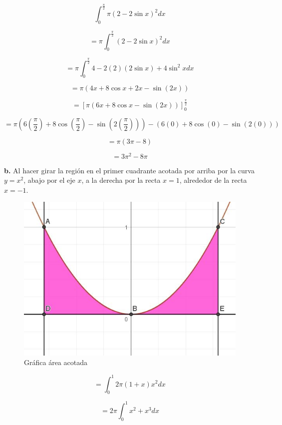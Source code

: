 \documentclass[12pt]{article}
\begin{document}
\begin{flushleft}
$$\int_{0}^{\frac{\pi}{2}}\pi \left ( 2-2\sin x \right )^{2} dx$$

$$=\pi \int_{0}^{\frac{\pi}{2}} \left ( 2-2\sin x \right )^{2} dx$$

$$=\pi \int_{0}^{\frac{\pi}{2}} 4-2\left ( 2 \right )\left (2\sin x \right )+4\sin^{2}x dx$$

$$=\pi \left ( 4x+8 \cos x+2x-\sin \left ( 2x \right ) \right )$$

$$=\left[\pi \left ( 6x+8 \cos x-\sin \left ( 2x \right ) \right )\right]_{0}^{\frac{\pi}{2}}$$


$$=\pi \left ( 6\left ( \frac{\pi}{2} \right )+8 \cos \left ( \frac{\pi}{2} \right )-\sin \left ( 2\left ( \frac{\pi}{2} \right ) \right ) \right )- \left ( 6\left ( 0 \right )+8 \cos \left (0 \right )-\sin \left ( 2\left ( 0 \right ) \right ) \right )$$


$$=\pi \left(3\pi-8\right)$$


$$=3\pi^{2}-8\pi$$


\textbf{b.} Al hacer girar la región en el primer cuadrante acotada por arriba por la curva $y=x^{2}$, abajo por el eje $x$, a la derecha por la recta $x=1$, alrededor de la recta $x=-1$.


\begin{figure}[H]
    \centering
    \includegraphics[scale=0.38]{IMAGEN III.jpeg}
    \caption{Gráfica área acotada}
    \label{fig:enter-label}
\end{figure}

$$=\int_{0}^{1}2\pi \left ( 1+x \right )x^{2} dx$$

$$=2\pi \int_{0}^{1}x^{2}+x^{3} dx$$


\end{flushleft}
\end{document}
